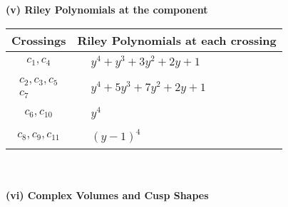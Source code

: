 \documentclass[1p]{elsarticle_modified}
\theoremstyle{definition}
\begin{document}
\newpage\renewcommand{\arraystretch}{1}
\flushleft \textbf{(v) Riley Polynomials at the component}\newline \\
\begin{tabular}{m{50pt}|m{274pt}}
Crossings & \hspace{64pt}Riley Polynomials at each crossing \\
\hline $$\begin{aligned}c_{1},c_{4}\end{aligned}$$&$\begin{aligned}
&y^4+y^3+3 y^2+2 y+1
\end{aligned}$\\
\hline $$\begin{aligned}c_{2},c_{3},c_{5}\\c_{7}\end{aligned}$$&$\begin{aligned}
&y^4+5 y^3+7 y^2+2 y+1
\end{aligned}$\\
\hline $$\begin{aligned}c_{6},c_{10}\end{aligned}$$&$\begin{aligned}
&y^4
\end{aligned}$\\
\hline $$\begin{aligned}c_{8},c_{9},c_{11}\end{aligned}$$&$\begin{aligned}
&(y-1)^4
\end{aligned}$\\
\hline
\end{tabular}\\~\\
\newpage\flushleft \textbf{(vi) Complex Volumes and Cusp Shapes}
\end{document}
